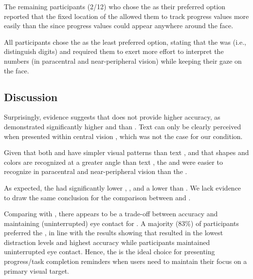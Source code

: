 The remaining participants (2/12) who chose the \linearbar{} as their preferred option reported that the fixed location of the \linearbar{} allowed them to track progress values more easily than the \circularbar{} since progress values could appear anywhere around the face.

All participants chose the \textbar{} as the least preferred option, stating that the \textbar{} was  (i.e., distinguish digits) and required them to exert more effort to interpret the numbers (in paracentral and near-peripheral vision) while keeping their gaze on the face.

\subsection{Discussion}

Surprisingly, evidence suggests that \textbar{} does not provide higher accuracy, as \circularbar{} demonstrated significantly higher \progressAccuracy{} and \perceivedEaseIdentification{} than \textbar{}. Text can only be clearly perceived when presented within central vision \cite{rayner_eye_1998, ishiguro_peripheral_2011}, which was not the case for our \textbar{} condition.

Given that both \circularbar{} and \linearbar{} have simpler visual patterns than text \cite[Ch~6]{wickens_engineering_2015}, and that shapes and colors are recognized at a greater angle than text \cite[Ch~C.9]{ishiguro_peripheral_2011, panero1979human}, the \circularbar{} and \linearbar{} were easier to recognize in paracentral and near-peripheral vision than the \textbar{}.

As expected, the \circularbar{} had significantly lower \perceivedInterruption{}, \perceivedTaskLoad{}, and a lower \distractionDigreee{} than \textbar{}. We lack evidence to draw the same conclusion for the comparison between \circularbar{} and \linearbar{}.

Comparing \textbar{} with \circularbar{}, there appears to be a trade-off between accuracy and maintaining (uninterrupted) eye contact for \textbar{}. A majority (83\%) of participants preferred the \circularbar{}, in line with the results showing that \circularbar{} resulted in the lowest distraction levels and highest accuracy while participants maintained uninterrupted eye contact. Hence, the \circularbar{} is the ideal choice for presenting progress/task completion reminders when users need to maintain their focus on a primary visual target.























